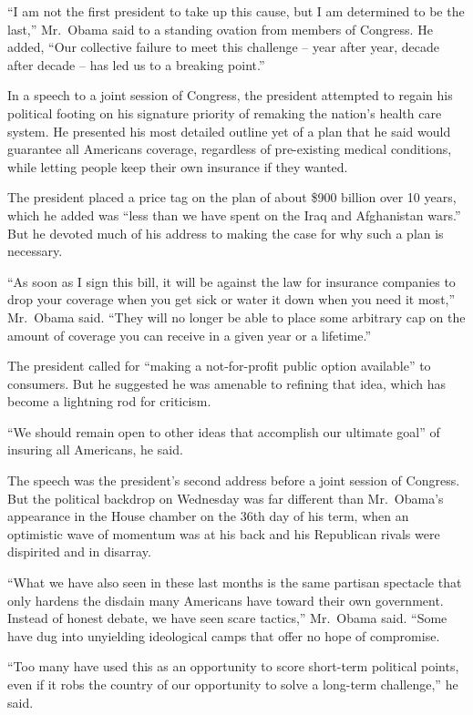﻿\documentclass[12pt]{article}
\begin{document}
``I am not the first president to take up this cause, but I am determined to be the last,''
Mr.~Obama said to a standing ovation from members of Congress. He added, ``Our collective failure to
meet this challenge – year after year, decade after decade – has led us to a breaking point.''

In a speech to a joint session of Congress, the president attempted to regain his political footing
on his signature priority of remaking the nation's health care system. He presented his most
detailed outline yet of a plan that he said would guarantee all Americans coverage, regardless of
pre-existing medical conditions, while letting people keep their own insurance if they wanted.

The president placed a price tag on the plan of about \$900 billion over 10 years, which he added
was ``less than we have spent on the Iraq and Afghanistan wars.'' But he devoted much of his address
to making the case for why such a plan is necessary.

``As soon as I sign this bill, it will be against the law for insurance companies to drop your
coverage when you get sick or water it down when you need it most,'' Mr.~Obama said. ``They will no
longer be able to place some arbitrary cap on the amount of coverage you can receive in a given year
or a lifetime.''

The president called for ``making a not-for-profit public option available'' to consumers. But he
suggested he was amenable to refining that idea, which has become a lightning rod for criticism.

``We should remain open to other ideas that accomplish our ultimate goal'' of insuring all
Americans, he said.

The speech was the president's second address before a joint session of Congress. But the political
backdrop on Wednesday was far different than Mr.~Obama's appearance in the House chamber on the 36th
day of his term, when an optimistic wave of momentum was at his back and his Republican rivals were
dispirited and in disarray.

``What we have also seen in these last months is the same partisan spectacle that only hardens the
disdain many Americans have toward their own government. Instead of honest debate, we have seen
scare tactics,'' Mr.~Obama said. ``Some have dug into unyielding ideological camps that offer no
hope of compromise.

``Too many have used this as an opportunity to score short-term political points, even if it robs
the country of our opportunity to solve a long-term challenge,'' he said.
\end{document}
